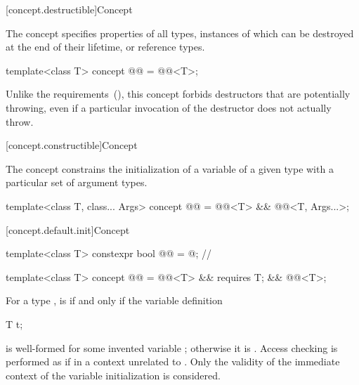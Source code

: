 [concept.destructible]{Concept }

\pnum
The  concept specifies properties of all types,
instances of which can be destroyed at the end of their lifetime, or reference
types.

\begin{itemdecl}
template<class T>
  concept @@ = @@<T>;
\end{itemdecl}

\begin{itemdescr}
\pnum
\begin{note}
Unlike the  requirements~(), this
concept forbids destructors that are potentially throwing, even if a particular
invocation of the destructor does not actually throw.
\end{note}
\end{itemdescr}

[concept.constructible]{Concept }

\pnum
The  concept constrains the initialization of a
variable of a given type with a particular set of argument types.

\begin{itemdecl}
template<class T, class... Args>
  concept @@ = @@<T> && @@<T, Args...>;
\end{itemdecl}

[concept.default.init]{Concept }

\begin{itemdecl}
template<class T>
  constexpr bool @@ = @\seebelow@;         // \expos

template<class T>
  concept @@ = @@<T> &&
                                  requires { T{}; } &&
                                  @@<T>;
\end{itemdecl}

\begin{itemdescr}
\pnum
For a type ,  is 
if and only if the variable definition
\begin{codeblock}
T t;
\end{codeblock}
is well-formed for some invented variable ;
otherwise it is .
Access checking is performed as if in a context unrelated to .
Only the validity of the immediate context of the variable initialization is considered.
\end{itemdescr}

